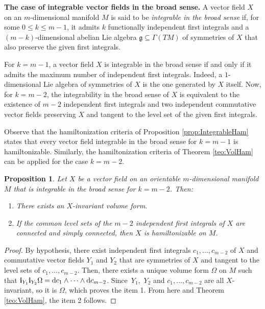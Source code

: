 \documentclass[10pt,a4paper]{amsart}
\newcommand{\dd}{{\rm d}}
\newcommand{\ii}{\mathbf{i}}
\numberwithin{equation}{section}
\newtheorem{Proposition}[Theorem]{Proposition}
 { \theoremstyle{definition}
\newtheorem{Definition}[Theorem]{Definition}
\newtheorem{Note}[Theorem]{Note}
\newtheorem{Example}[Theorem]{Example}
\newtheorem{Remark}[Theorem]{Remark} }
\begin{document}
{\bf The case of integrable vector fields in the broad sense.} A vector field $X$ on an $m$-dimensional manifold $M$ is said to be \emph{integrable in the broad sense} \cite[Definition 1]{Bog98} if, for some $0\leq k\leq m-1$, it admits $k$ functionally independent first integrals and a $(m-k)$-dimensional abelian Lie algebra $\mathfrak{g} \subseteq \Gamma(TM)$ of symmetries of $X$ that also preserve the given first integrals.

For $k=m-1$, a vector field $X$ is integrable in the broad sense if and only if it admits the maximum number of independent first integrals. Indeed, a $1$-dimensional Lie algebra of symmetries of $X$ is the one generated by $X$ itself. Now, for $k=m-2$, the integrability in the broad sense of $X$ is equivalent to the existence of $m-2$ independent first integrals and two independent commutative vector fields preserving $X$ and tangent to the level set of the given first integrals.

Observe that the hamiltonization criteria of Proposition \ref{prop:IntegrableHam} states that every vector field integrable in the broad sense for $k=m-1$ is hamiltonizable. Similarly, the hamiltonization criteria of Theorem \ref{teo:VolHam} can be applied for the case $k=m-2$.

\begin{Proposition}
Let $X$ be a vector field on an orientable $m$-dimensional manifold $M$ that is integrable in the broad sense for $k=m-2$. Then:
 \begin{enumerate}\itemsep=0pt
 \item[$1.$] There exists an $X$-invariant volume form.
 \item[$2.$] If the common level sets of the $m-2$ independent first integrals of $X$ are connected and simply connected, then $X$ is hamiltonizable on $M$.
 \end{enumerate}
\end{Proposition}
{\sloppy\begin{proof}
By hypothesis, there exist independent first integrals $c_1,\dots,c_{m-2}$ of $X$ and commutative vector fields $Y_1$ and $Y_2$ that are symmetries of $X$ and tangent to the level sets of $c_1,\dots,c_{m-2}$. Then, there exists a unique volume form $\Omega$ on $M$ such that $\ii_{Y_1}\ii_{Y_2}\Omega = \dd c_1\wedge\cdots\wedge\dd c_{m-2}$. Since~$Y_1$,~$Y_2$ and $c_1,\dots,c_{m-2}$ are all $X$-invariant, so it is $\Omega$, which proves the item 1. From here and Theorem \ref{teo:VolHam}, the item 2 follows.
\end{proof}}
\end{document}
